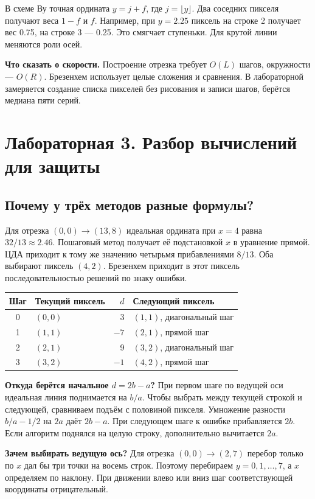 \documentclass[11pt,a4paper]{extarticle}
\begin{document}
В схеме Ву точная ордината $y=j+f$, где $j=\lfloor y\rfloor$. Два соседних пикселя получают веса $1-f$ и $f$. Например, при $y=2.25$ пиксель на строке 2 получает вес 0.75, на строке 3 --- 0.25. Это смягчает ступеньки. Для крутой линии меняются роли осей.

\textbf{Что сказать о скорости.} Построение отрезка требует $O(L)$ шагов, окружности --- $O(R)$. Брезенхем использует целые сложения и сравнения. В лабораторной замеряется создание списка пикселей без рисования и записи шагов, берётся медиана пяти серий.

\clearpage
\section*{Лабораторная 3. Разбор вычислений для защиты}
\subsection*{Почему у трёх методов разные формулы?}
Для отрезка $(0,0)\to(13,8)$ идеальная ордината при $x=4$ равна $32/13\approx2.46$. Пошаговый метод получает её подстановкой $x$ в уравнение прямой. ЦДА приходит к тому же значению четырьмя прибавлениями $8/13$. Оба выбирают пиксель $(4,2)$. Брезенхем приходит в этот пиксель последовательностью решений по знаку ошибки.
\begin{center}\begin{tabular}{clrl}\toprule
Шаг & Текущий пиксель & $d$ & Следующий пиксель\\\midrule
0 & $(0,0)$ & 3 & $(1,1)$, диагональный шаг\\
1 & $(1,1)$ & $-7$ & $(2,1)$, прямой шаг\\
2 & $(2,1)$ & 9 & $(3,2)$, диагональный шаг\\
3 & $(3,2)$ & $-1$ & $(4,2)$, прямой шаг\\\bottomrule\end{tabular}\end{center}
\textbf{Откуда берётся начальное $d=2b-a$?} При первом шаге по ведущей оси идеальная линия поднимается на $b/a$. Чтобы выбрать между текущей строкой и следующей, сравниваем подъём с половиной пикселя. Умножение разности $b/a-1/2$ на $2a$ даёт $2b-a$. При следующем шаге к ошибке прибавляется $2b$. Если алгоритм поднялся на целую строку, дополнительно вычитается $2a$.

\textbf{Зачем выбирать ведущую ось?} Для отрезка $(0,0)\to(2,7)$ перебор только по $x$ дал бы три точки на восемь строк. Поэтому перебираем $y=0,1,\ldots,7$, а $x$ определяем по наклону. При движении влево или вниз шаг соответствующей координаты отрицательный.
\end{document}
